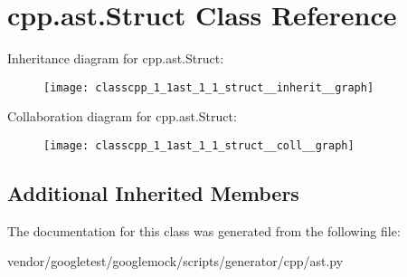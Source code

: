 \hypertarget{classcpp_1_1ast_1_1_struct}{}\section{cpp.\+ast.\+Struct Class Reference}
\label{classcpp_1_1ast_1_1_struct}


Inheritance diagram for cpp.\+ast.\+Struct\+:
\nopagebreak
\begin{figure}[H]
\begin{center}
\leavevmode
\texttt{[image: classcpp\_1\_1ast\_1\_1\_struct\_\_inherit\_\_graph]}
\end{center}
\end{figure}


Collaboration diagram for cpp.\+ast.\+Struct\+:
\nopagebreak
\begin{figure}[H]
\begin{center}
\leavevmode
\texttt{[image: classcpp\_1\_1ast\_1\_1\_struct\_\_coll\_\_graph]}
\end{center}
\end{figure}
\subsection*{Additional Inherited Members}


The documentation for this class was generated from the following file\+:\begin{DoxyCompactItemize}
\item 
vendor/googletest/googlemock/scripts/generator/cpp/ast.\+py\end{DoxyCompactItemize}

